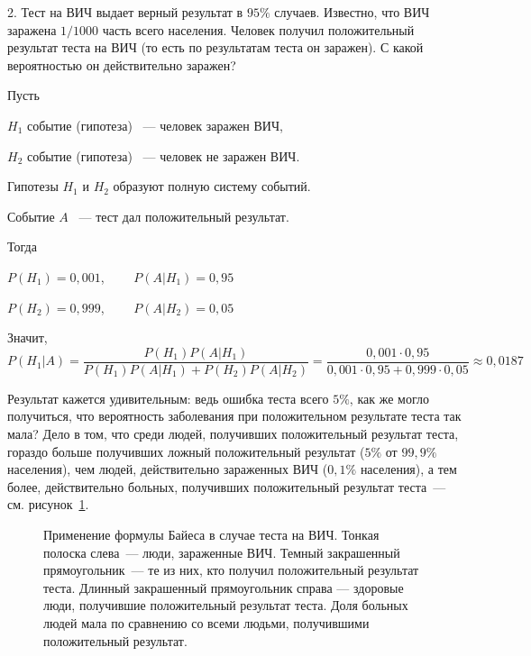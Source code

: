 \documentclass[11pt]{article}
\begin{document}
2. Тест на ВИЧ выдает верный результат в $95\%$ случаев. Известно, что ВИЧ заражена $1/1000$ часть всего населения. Человек получил положительный результат теста на ВИЧ (то есть по результатам теста он заражен). С какой вероятностью он действительно заражен?

Пусть

$H_{1}$ событие (гипотеза)  ~--- человек заражен ВИЧ,

$H_{2}$ событие (гипотеза) ~--- человек не заражен ВИЧ.

Гипотезы $H_{1}$ и $H_{2}$ образуют полную систему событий.

Событие $A$ ~--- тест дал положительный результат.

Тогда

$P(H_{1})=0,001$,~~~~      $P(A|H_{1})=0,95 $

$P(H_{2})=0,999$,~~~~      $P(A|H_{2})=0,05$

\vspace{1em}

Значит,
$$	P(H_{1}|A)=\frac{P(H_{1})P(A|H_{1})}{P(H_{1})P(A|H_{1})+P(H_{2})P(A|H_{2})}=\frac{0,001\cdot0,95}{0,001\cdot0,95+0,999\cdot0,05}\approx0,0187$$

Результат кажется удивительным: ведь ошибка теста всего $5\%$, как же могло получиться, что вероятность заболевания при положительном результате теста так мала? Дело в том, что среди людей, получивших положительный результат теста, гораздо больше получивших ложный положительный результат ($5\%$ от $99,9\%$ населения), чем людей, действительно зараженных ВИЧ ($0{,}1\%$ населения), а тем более, действительно больных, получивших положительный результат теста~--- см. рисунок~\ref{fig:hivtest}.

\begin{figure}[htb]
	\begin{center}
		\caption{Применение формулы Байеса в случае теста на ВИЧ. Тонкая полоска слева~--- люди, зараженные ВИЧ. Темный закрашенный прямоугольник~--- те из них, кто получил положительный результат теста. Длинный закрашенный прямоугольник справа — здоровые люди, получившие положительный результат теста. Доля больных людей мала по сравнению со всеми людьми, получившими положительный результат.}\label{fig:hivtest}
	\end{center}
\end{figure}
\end{document}
